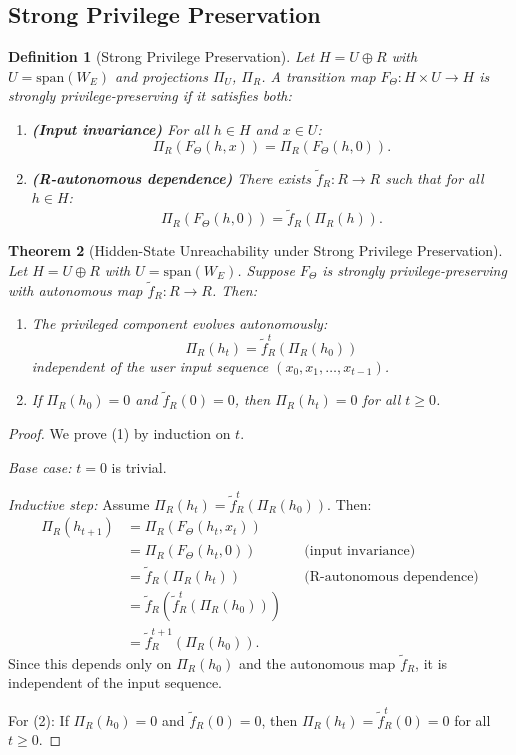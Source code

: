 \documentclass[11pt,a4paper]{article}
\newtheorem{theorem}{Theorem}[section]
\newtheorem{definition}[theorem]{Definition}
\begin{document}
\subsection{Strong Privilege Preservation}

\begin{definition}[Strong Privilege Preservation]
\label{def:strong-privilege}
Let $H = U \oplus R$ with $U = \text{span}(W_E)$ and projections $\Pi_U$, $\Pi_R$. A transition map $F_\Theta: H \times U \to H$ is \emph{strongly privilege-preserving} if it satisfies both:
\begin{enumerate}
    \item \textbf{(Input invariance)} For all $h \in H$ and $x \in U$:
    \[
    \Pi_R(F_\Theta(h, x)) = \Pi_R(F_\Theta(h, 0)).
    \]
    \item \textbf{(R-autonomous dependence)} There exists $\tilde{f}_R: R \to R$ such that for all $h \in H$:
    \[
    \Pi_R(F_\Theta(h, 0)) = \tilde{f}_R(\Pi_R(h)).
    \]
\end{enumerate}
\end{definition}

\begin{theorem}[Hidden-State Unreachability under Strong Privilege Preservation]
\label{thm:hidden-state-unreachability}
Let $H = U \oplus R$ with $U = \text{span}(W_E)$. Suppose $F_\Theta$ is strongly privilege-preserving with autonomous map $\tilde{f}_R: R \to R$. Then:
\begin{enumerate}
    \item The privileged component evolves autonomously:
    \[
    \Pi_R(h_t) = \tilde{f}_R^t(\Pi_R(h_0))
    \]
    independent of the user input sequence $(x_0, x_1, \ldots, x_{t-1})$.
    \item If $\Pi_R(h_0) = 0$ and $\tilde{f}_R(0) = 0$, then $\Pi_R(h_t) = 0$ for all $t \geq 0$.
\end{enumerate}
\end{theorem}

\begin{proof}
We prove (1) by induction on $t$.

\emph{Base case:} $t = 0$ is trivial.

\emph{Inductive step:} Assume $\Pi_R(h_t) = \tilde{f}_R^t(\Pi_R(h_0))$. Then:
\begin{align*}
\Pi_R(h_{t+1}) &= \Pi_R(F_\Theta(h_t, x_t)) \\
&= \Pi_R(F_\Theta(h_t, 0)) && \text{(input invariance)} \\
&= \tilde{f}_R(\Pi_R(h_t)) && \text{(R-autonomous dependence)} \\
&= \tilde{f}_R(\tilde{f}_R^t(\Pi_R(h_0))) \\
&= \tilde{f}_R^{t+1}(\Pi_R(h_0)).
\end{align*}
Since this depends only on $\Pi_R(h_0)$ and the autonomous map $\tilde{f}_R$, it is independent of the input sequence.

For (2): If $\Pi_R(h_0) = 0$ and $\tilde{f}_R(0) = 0$, then $\Pi_R(h_t) = \tilde{f}_R^t(0) = 0$ for all $t \geq 0$.
\end{proof}
\end{document}

